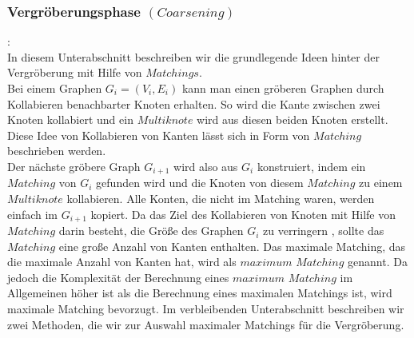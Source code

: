 \documentclass[runningheads]{llncs}
\begin{document}
\subsubsection{Vergröberungsphase $(Coarsening)$}:\\
In diesem Unterabschnitt beschreiben wir die grundlegende Ideen hinter der Vergröberung mit Hilfe von $Matchings$.\\ 
Bei einem Graphen $G_i = (V_i, E_i)$ kann man einen gröberen Graphen durch Kollabieren benachbarter Knoten erhalten. So wird die Kante zwischen zwei Knoten kollabiert und ein $Multiknote$
wird aus diesen beiden Knoten erstellt. Diese Idee von Kollabieren von Kanten lässt sich in Form von $Matching$ beschrieben werden. \\
Der nächste gröbere Graph $G_{i+1}$ wird also aus $G_i$ konstruiert, indem ein $Matching$ von $G_i$ gefunden wird und die Knoten von diesem $Matching$ zu einem $Multiknote$ kollabieren. Alle Konten, die nicht im Matching waren, werden einfach im $G_{i+1}$ kopiert. Da das Ziel des Kollabieren von Knoten mit Hilfe von $Matching$ darin besteht, die Größe des Graphen $G_i$ zu verringern
, sollte das $Matching$ eine große Anzahl von Kanten enthalten. 
 Das maximale Matching, das
die maximale Anzahl von Kanten hat, wird als $maximum$ $Matching$ genannt. Da jedoch die Komplexität der Berechnung eines $maximum$ $Matching$ im Allgemeinen höher ist als die Berechnung eines maximalen Matchings ist, wird maximale Matching bevorzugt. Im verbleibenden Unterabschnitt beschreiben wir zwei Methoden, die wir zur Auswahl maximaler
Matchings für die Vergröberung. 
\end{document}
